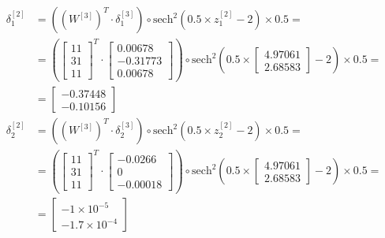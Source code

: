 \documentclass[12pt]{article}
\begin{document}
\begin{enumerate}[leftmargin=\labelsep]
        \begingroup
        \allowdisplaybreaks
          \begin{align*}
              \delta^{[2]}_1 &= \left(\left(W^{[3]}\right)^{T} \cdot \delta^{[3]}_1\right) \circ \text{sech}^{2}\left(0.5\times z^{[2]}_1 - 2\right) \times 0.5 = \\
             &= \left(\begin{bmatrix} 1 1 \\ 3 1 \\ 1 1\end{bmatrix}^{T} \cdot \begin{bmatrix} 0.00678 \\ -0.31773 \\ 0.00678 \end{bmatrix}\right) \circ \text{sech}^{2}\left(0.5\times\begin{bmatrix} 4.97061 \\ 2.68583\end{bmatrix} - 2\right) \times 0.5 = \\
             &= \begin{bmatrix} -0.37448 \\ -0.10156 \end{bmatrix} \\
                 \delta^{[2]}_2 &= \left(\left(W^{[3]}\right)^{T} \cdot \delta^{[3]}_2\right) \circ  \text{sech}^{2}\left(0.5\times z^{[2]}_2 - 2\right) \times 0.5 = \\
             &= \left(\begin{bmatrix} 1 1 \\ 3 1 \\ 1 1\end{bmatrix}^{T} \cdot \begin{bmatrix} -0.0266 \\ 0 \\ -0.00018 \end{bmatrix}\right) \circ \text{sech}^{2}\left(0.5\times\begin{bmatrix} 4.97061 \\ 2.68583\end{bmatrix} - 2\right) \times 0.5 = \\
             &= \begin{bmatrix} -1 \times 10^{-5} \\ -1.7 \times 10^{-4} \end{bmatrix}
          \end{align*}
        \endgroup


\end{enumerate}
\end{document}
